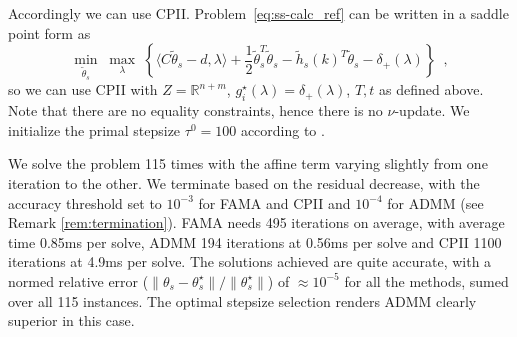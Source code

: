\documentclass[openany]{now}
\newcommand{\reals}{{\mathbb R}}
\begin{document}
Accordingly we can use CPII. Problem~\ref{eq:ss-calc_ref} can be written in a saddle point form as
\[
\underset{\tilde{\theta}_s}{\min} \; \underset{\lambda}{\max} \; \left\{\langle C \tilde{\theta}_s - d,\lambda\rangle  + \frac{1}{2}\tilde{\theta}_s^T\tilde{\theta}_s - \tilde{h}_s(k)^T\tilde{\theta}_s - \delta_+(\lambda) \right\}\enspace,
\]
so we can use CPII with $Z=\reals^{n+m}$, $g_i^\star(\lambda)=\delta_+(\lambda)$, $T,t$ as defined above. Note that there are no equality constraints, hence there is no $\nu$-update. We initialize the primal stepsize $\tau^0=100$ according to \cite[Theorem~2]{chamb}.


We solve the problem 115 times with the affine term varying slightly from one iteration to the other. We terminate based on the residual decrease, with the accuracy threshold set to $10^{-3}$ for FAMA and CPII and $10^{-4}$ for ADMM (see Remark \ref{rem:termination}). FAMA needs 495 iterations on average, with average time 0.85ms per solve, ADMM 194 iterations at 0.56ms per solve and CPII 1100 iterations at 4.9ms per solve. The solutions achieved are quite accurate, with a normed relative error ($\|\theta_s-\theta_s^\star\|/\|\theta_s^\star\|$) of $\approx 10^{-5}$ for all the methods, sumed over all 115 instances. The optimal stepsize selection renders ADMM clearly superior in this case.
\end{document}
